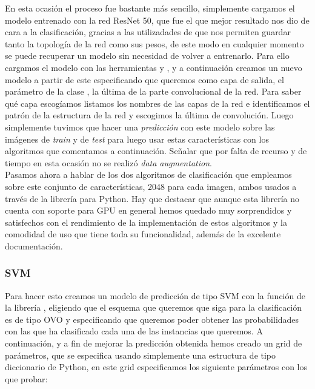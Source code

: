 En esta ocasión el proceso fue bastante más sencillo, simplemente cargamos el modelo entrenado con la red ResNet 50, que fue el que mejor resultado nos dio de cara a la clasificación, gracias a las utilizadades de  que nos permiten guardar tanto la topología de la red como sus pesos, de este modo en cualquier momento se puede recuperar un modelo sin necesidad de volver a entrenarlo. Para ello cargamos el modelo con las herramientas  y , y a continuación creamos un nuevo modelo a partir de este especificando que queremos como capa de salida, el parámetro  de la clase , la última de la parte convolucional de la red. Para saber qué capa escogíamos listamos los nombres de las capas de la red e identificamos el patrón de la estructura de la red y escogimos la última de convolución. Luego simplemente tuvimos que hacer una \textit{predicción} con este modelo sobre las imágenes de \textit{train} y de \textit{test} para luego usar estas características con los algoritmos que comentamos a continuación. Señalar que por falta de recurso y de tiempo en esta ocasión no se realizó \textit{data augmentation}.\\

Pasamos ahora a hablar de los dos algoritmos de clasificación que empleamos sobre este conjunto de características, 2048 para cada imagen,  ambos usados a través de la librería  para Python. Hay que destacar que aunque esta librería no cuenta con soporte para GPU en general hemos quedado muy sorprendidos y satisfechos con el rendimiento de la implementación de estos algoritmos y la comodidad de uso que tiene toda su funcionalidad, además de la excelente documentación.

\subsubsection{SVM}

Para hacer esto creamos un modelo de predicción de tipo SVM con la función  de la librería , eligiendo que el esquema que queremos que siga para la clasificación es de tipo OVO y especificando que queremos poder obtener las probabilidades con las que ha clasificado cada una de las instancias que queremos. A continuación, y a fin de mejorar la predicción obtenida hemos creado un grid de parámetros, que se especifica usando simplemente una estructura de tipo diccionario de Python, en este grid especificamos los siguiente parámetros con los que probar:

